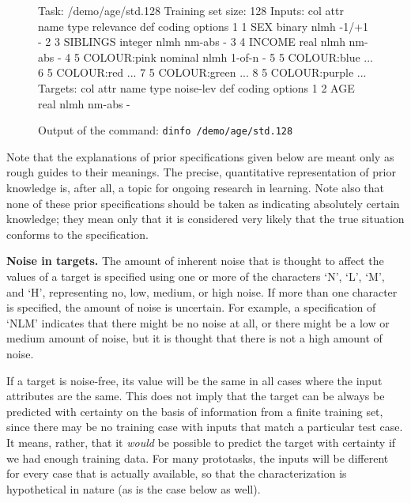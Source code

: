 \begin{figure}[t]
\begin{Session}
Task: /demo/age/std.128
Training set size: 128
Inputs: 
 col attr name          type   relevance  def coding  options
   1   1  SEX           binary   nlmh       -1/+1        -
   2   3  SIBLINGS      integer  nlmh       nm-abs       -
   3   4  INCOME        real     nlmh       nm-abs       -
   4   5  COLOUR:pink   nominal  nlmh       1-of-n       -
   5   5  COLOUR:blue                  ...
   6   5  COLOUR:red                   ...
   7   5  COLOUR:green                 ...
   8   5  COLOUR:purple                ...
Targets: 
 col attr name         type    noise-lev def coding  options
   1   2  AGE           real     nlmh       nm-abs       -
\end{Session}\vspace{-4pt}

\caption{Output of the command: \texttt{dinfo /demo/age/std.128}
        }\label{fig:task-prior}
\end{figure}

Note that the explanations of prior specifications given below are
meant only as rough guides to their meanings.  The precise,
quantitative representation of prior knowledge is, after all, a topic
for ongoing research in learning.  Note also that none of these prior
specifications should be taken as indicating absolutely certain
knowledge; they mean only that it is considered very likely that the
true situation conforms to the specification.

{\bf Noise in targets.\/} The amount of inherent noise that is thought
to affect the values of a target is specified using one or more of the
characters `N', `L', `M', and `H', representing no, low,
medium, or high noise.  If more than one character is specified, the
amount of noise is uncertain.  For example, a specification of `NLM'
indicates that there might be no noise at all, or there might be a low
or medium amount of noise, but it is thought that there is not a high
amount of noise.

If a target is noise-free, its value will be the same in all cases
where the input attributes are the same.  This does not imply that the
target can be always be predicted with certainty on the basis of
information from a finite training set, since there may be no training
case with inputs that match a particular test case.  It means, rather,
that it \emph{would} be possible to predict the target with certainty
if we had enough training data.  For many prototasks, the inputs will
be different for every case that is actually available, so that the
characterization is hypothetical in nature (as is the case below as
well).

